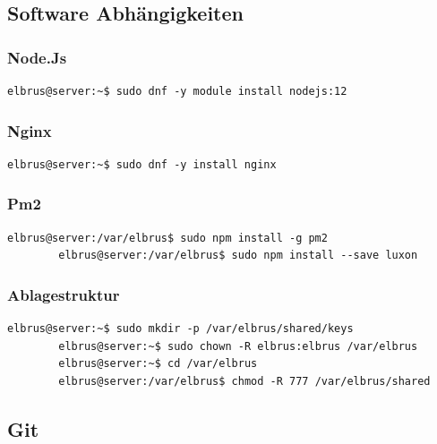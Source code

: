 \documentclass{article}
\begin{document}
	\subsection{Software Abhängigkeiten}
	
	\subsubsection{Node.Js}
	
	\lstset{style=commands}
	\begin{lstlisting}[caption={Installieren des Framworks 'Node.Js'.}]
		elbrus@server:~$ sudo dnf -y module install nodejs:12
	\end{lstlisting}

	\subsubsection{Nginx}
	
	\lstset{style=commands}
	\begin{lstlisting}[caption={Installieren der Webserver-Software 'Nginx'.}]
		elbrus@server:~$ sudo dnf -y install nginx
	\end{lstlisting}

	\subsubsection{Pm2}
		\lstset{style=commands}
	\begin{lstlisting}[caption={Installieren von 'pm2'.}]
		elbrus@server:/var/elbrus$ sudo npm install -g pm2
		elbrus@server:/var/elbrus$ sudo npm install --save luxon
	\end{lstlisting}
	
	\subsubsection{Ablagestruktur}
	
	\lstset{style=commands}
	\begin{lstlisting}[caption={Anlegen der Verzeichnissstruktur.}]
		elbrus@server:~$ sudo mkdir -p /var/elbrus/shared/keys
		elbrus@server:~$ sudo chown -R elbrus:elbrus /var/elbrus
		elbrus@server:~$ cd /var/elbrus
		elbrus@server:/var/elbrus$ chmod -R 777 /var/elbrus/shared
	\end{lstlisting}
	\newpage

	\subsection{Git}
	
\end{document}
